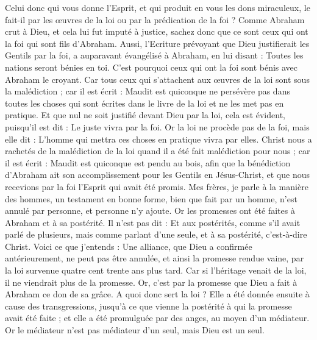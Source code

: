 \begin{multicols}{2}
Celui donc qui vous donne l'Esprit, et qui produit en vous les dons miraculeux, le fait-il par les œuvres de la loi ou par la prédication de la foi ?
Comme Abraham crut à Dieu, et cela lui fut imputé à justice,
sachez donc que ce sont ceux qui ont la foi qui sont fils d'Abraham.
Aussi, l'Ecriture prévoyant que Dieu justifierait les Gentils par la foi, a auparavant évangélisé à Abraham, en lui disant : Toutes les nations seront bénies en toi.
C'est pourquoi ceux qui ont la foi sont bénis avec Abraham le croyant.
Car tous ceux qui s’attachent aux œuvres de la loi sont sous la malédiction ; car il est écrit : Maudit est quiconque ne persévère pas dans toutes les choses qui sont écrites dans le livre de la loi et ne les met pas en pratique.
Et que nul ne soit justifié devant Dieu par la loi, cela est évident, puisqu’il est dit : Le juste vivra par la foi.
Or la loi ne procède pas de la foi, mais elle dit : L'homme qui mettra ces choses en pratique vivra par elles.
Christ nous a rachetés de la malédiction de la loi quand il a été fait malédiction pour nous ; car il est écrit : Maudit est quiconque est pendu au bois,
afin que la bénédiction d'Abraham ait son accomplissement pour les Gentils en Jésus-Christ, et que nous recevions par la foi l'Esprit qui avait été promis.
Mes frères, je parle à la manière des hommes, un testament en bonne forme, bien que fait par un homme, n’est annulé par personne, et personne n’y ajoute.
Or les promesses ont été faites à Abraham et à sa postérité. Il n'est pas dit : Et aux postérités, comme s'il avait parlé de plusieurs, mais comme parlant d'une seule, et à sa postérité, c’est-à-dire Christ.
Voici ce que j’entends : Une alliance, que Dieu a confirmée antérieurement, ne peut pas être annulée, et ainsi la promesse rendue vaine, par la loi survenue quatre cent trente ans plus tard.
Car si l'héritage venait de la loi, il ne viendrait plus de la promesse. Or, c’est par la promesse que Dieu a fait à Abraham ce don de sa grâce.
A quoi donc sert la loi ? Elle a été donnée ensuite à cause des transgressions, jusqu'à ce que vienne la postérité à qui la promesse avait été faite ; et elle a été promulguée par des anges, au moyen d'un médiateur.
Or le médiateur n'est pas médiateur d'un seul, mais Dieu est un seul.

\end{multicols}
